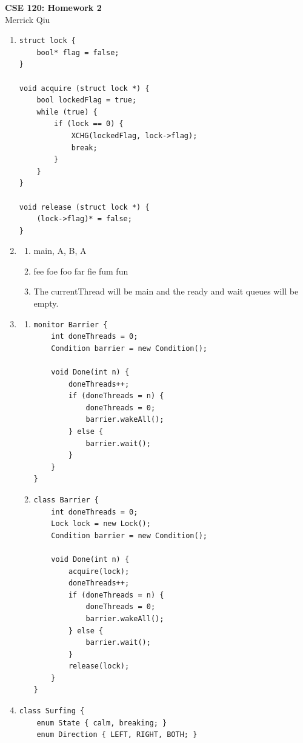 \documentclass{article}
\begin{document}
\begin{center}
	\huge{\bf CSE 120: Homework 2} \\
	Merrick Qiu
\end{center}

\begin{enumerate}
    \item \begin{lstlisting}
struct lock {
    bool* flag = false;
}

void acquire (struct lock *) {
    bool lockedFlag = true;
    while (true) {
        if (lock == 0) {
            XCHG(lockedFlag, lock->flag);
            break;
        }
    }
}

void release (struct lock *) {
    (lock->flag)* = false;
}
   \end{lstlisting}
    \item \begin{enumerate}
        \item main, A, B, A
        \item fee foe foo far fie fum fun
        \item The currentThread will be main and 
        the ready and wait queues will be empty.
    \end{enumerate}
\item \begin{enumerate}
\item \begin{lstlisting}
monitor Barrier {
    int doneThreads = 0;
    Condition barrier = new Condition();

    void Done(int n) {
        doneThreads++;
        if (doneThreads = n) {
            doneThreads = 0;
            barrier.wakeAll();
        } else {
            barrier.wait();
        }
    }
}
\end{lstlisting}

\item \begin{lstlisting}
class Barrier {
    int doneThreads = 0;
    Lock lock = new Lock();
    Condition barrier = new Condition();

    void Done(int n) {
        acquire(lock);
        doneThreads++;
        if (doneThreads = n) {
            doneThreads = 0;
            barrier.wakeAll();
        } else {
            barrier.wait();
        }
        release(lock);
    }
}
\end{lstlisting}
    \end{enumerate}
    \item 
\begin{lstlisting}
class Surfing {
    enum State { calm, breaking; }
    enum Direction { LEFT, RIGHT, BOTH; }


\end{lstlisting}
\end{enumerate}
\end{document}

